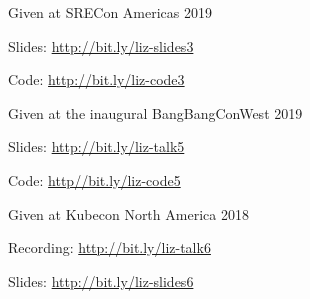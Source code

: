 \documentclass[letterpaper,11pt,notitlepage]{article}
\begin{document}
      \begin{employment}
          \item Given at SRECon Americas 2019
          \item Slides: \url{http://bit.ly/liz-slides3}
          \item Code: \url{http://bit.ly/liz-code3}
      \end{employment}
      \begin{employment}
        \item Given at the inaugural BangBangConWest 2019
        \item Slides: \url{http://bit.ly/liz-talk5}
        \item Code: \url{http//bit.ly/liz-code5}
      \end{employment}
      \begin{employment}
        \item Given at Kubecon North America 2018
        \item Recording: \url{http://bit.ly/liz-talk6}
        \item Slides: \url{http://bit.ly/liz-slides6}
      \end{employment}
\end{document}
